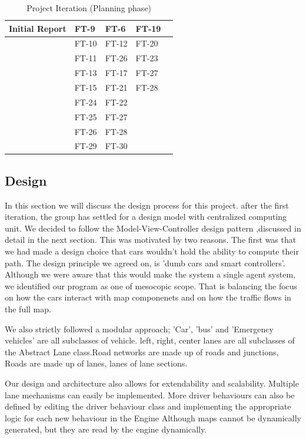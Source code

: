 \documentclass[11pt]{article}
\begin{document}
{\begin{itemize}
\begin{itemize}
\begin{table}[H]
\begin{tabular}{|m{3cm}|m{2cm}|m{2cm}|m{2cm}|m{3cm}|}
		Initial Report & FT-9 & FT-6 & FT-19 & \\ \hline
		
		& FT-10 & FT-12 & FT-20 & \\ \hline
		
		& FT-11 & FT-26 & FT-23 \\ \hline
		
		& FT-13 & FT-17 & FT-27 &\\ \hline
		& FT-15 & FT-21 & FT-28 &\\ \hline
		& FT-24 & FT-22 && \\ \hline
		& FT-25 & FT-27&& \\ \hline
		&FT-26  & FT-28 && \\ \hline
		& FT-29 & FT-30 && \\ \hline
	
		\end{tabular}
		\caption{Project Iteration (Planning phase)}
		\label{table:iteration} 
		\end{table}
		
    
    \end{itemize}

  
	
\subsection{Design}
In this section we will discuss the design process for this project. after the first iteration, the group has settled for a design model with centralized computing unit. We decided to follow the Model-View-Controller design pattern ,discussed in detail in the next section. This was motivated by two reasons. The first was that we had made a design choice that cars wouldn't hold the ability to compute their path. The design principle we agreed on, is 'dumb cars and smart controllers'. Although we were aware that this would make the system a single agent system, we identified our program as one of mesocopic scope. That is balancing the focus on how the cars interact with map componenets and on how the traffic flows in the full map. 

We also strictly followed a modular approach; 'Car', 'bus'  and 'Emergency vehicles' are all subclasses of vehicle. left, right, center lanes are all subclasses of the Abstract Lane class.Road networks are made up of roads and junctions, Roads are made up of lanes, lanes of lane sections.

Our design and architecture also allows for extendability and scalability. Multiple lane mechanisms can easily be implemented. More driver behaviours can also be defined by editing the driver behaviour class and implementing the appropriate logic for each new behaviour in the Engine Although maps cannot be dynamically generated, but they are read by the engine dynamically.
 

\end{itemize}}
\end{document}
